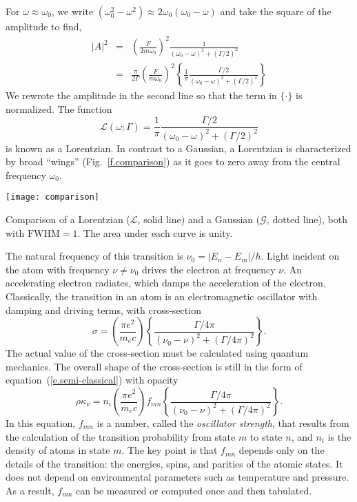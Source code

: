 For $\omega \approx \omega_0$, we write $(\omega_0^2-\omega^2)\approx 2\omega_0(\omega_0-\omega)$ and take the square of the amplitude to find,
\begin{eqnarray}
    \left|A\right|^2 &=& \left(\frac{F}{2m\omega_0}\right)^2
        \frac{1}{(\omega_0-\omega)^2 + (\Gamma/2)^2}\nonumber\\
    &=& \frac{\pi}{2\Gamma}\left(\frac{F}{m\omega_0}\right)^2
        \left\{\frac{1}{\pi}\frac{\Gamma/2}{(\omega_0-\omega)^2 + (\Gamma/2)^2}\right\}
\end{eqnarray}
We rewrote the amplitude in the second line so that the term in $\{\cdot\}$ is normalized. The function
\[
    \mathcal{L}(\omega;\Gamma) = \frac{1}{\pi} 
        \frac{\Gamma/2}{(\omega_0-\omega)^2 + (\Gamma/2)^2}
\]
is known as a Lorentzian.  In contrast to a Gaussian, a Lorentzian is characterized by broad ``wings'' (Fig.~\ref{f.comparison}) as it goes to zero away from the central frequency $\omega_{0}$.
\begin{marginfigure}[-4\baselineskip]
\texttt{[image: comparison]}
\caption[Comparison of Lorentzian and Gaussian distributions]{\label{f.comparison}
Comparison of a Lorentzian ($\mathcal{L}$, solid line) and a Gaussian ($\mathcal{G}$, dotted line), both with $\mathrm{FWHM}=1$. The area under each curve is unity.}
\end{marginfigure}

 The natural frequency of this transition is $\nu_0 = |E_n-E_m|/h$. Light incident on the atom with frequency $\nu\neq\nu_0$ drives the electron at frequency $\nu$. An accelerating electron radiates, which damps the acceleration of the electron.  Classically, the transition in an atom is an electromagnetic oscillator with damping and driving terms, with cross-section
\begin{equation}\label{e.semi-classical}
    \sigma = \left(\frac{\pi e^2}{m_e c}\right)
    \left\{\frac{\Gamma/4\pi}{(\nu_0-\nu)^2 + (\Gamma/4\pi)^2}\right\}.
\end{equation}
The actual value of the cross-section must be calculated using quantum mechanics. The overall shape of the cross-section is still in the form of equation~(\ref{e.semi-classical}) with opacity
\begin{equation}
    \rho\kappa_\nu = n_i \left(\frac{\pi e^2}{m_e c}\right) f_{mn}
        \left\{\frac{\Gamma/4\pi}{(\nu_0-\nu)^2 + (\Gamma/4\pi)^2}\right\}.
\end{equation}
In this equation, $f_{mn}$ is a number, called the \emph{oscillator strength}, that results from the calculation of the transition probability from state $m$ to state $n$, and $n_i$ is the density of atoms in state $m$.  The key point is that $f_{mn}$ depends only on the details of the transition: the energies, spins, and parities of the atomic states.  It does not depend on environmental parameters such as temperature and pressure.  As a result, $f_{mn}$ can be measured or computed once and then tabulated.


